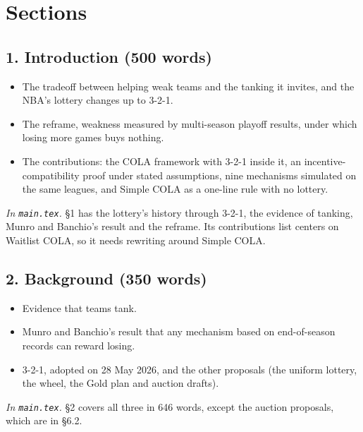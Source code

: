 \documentclass[10pt]{article}
\newcommand{\inmain}[1]{\textit{In \texttt{main.tex}.} #1\par}
\begin{document}
\section{Sections}

\subsection{1. Introduction (500 words)}
\begin{itemize}
\item The tradeoff between helping weak teams and the tanking it invites, and the NBA's lottery changes up to 3-2-1.
\item The reframe, weakness measured by multi-season playoff results, under which losing more games buys nothing.
\item The contributions: the COLA framework with 3-2-1 inside it, an incentive-compatibility proof under stated assumptions, nine mechanisms simulated on the same leagues, and Simple COLA as a one-line rule with no lottery.
\end{itemize}
\inmain{\S1 has the lottery's history through 3-2-1, the evidence of tanking, Munro and Banchio's result and the reframe. Its contributions list centers on Waitlist COLA, so it needs rewriting around Simple COLA.}

\subsection{2. Background (350 words)}
\begin{itemize}
\item Evidence that teams tank.
\item Munro and Banchio's result that any mechanism based on end-of-season records can reward losing.
\item 3-2-1, adopted on 28 May 2026, and the other proposals (the uniform lottery, the wheel, the Gold plan and auction drafts).
\end{itemize}
\inmain{\S2 covers all three in 646 words, except the auction proposals, which are in \S6.2.}
\end{document}

